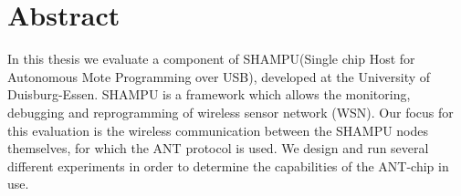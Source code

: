 
\cleardoublepage
\section*{Abstract}
In this thesis we evaluate a component of SHAMPU(Single chip Host for Autonomous Mote Programming over USB), developed at the University of Duisburg-Essen. 
SHAMPU is a framework which allows the monitoring, debugging and reprogramming of wireless sensor network (WSN). 
Our focus for this evaluation is the wireless communication between the SHAMPU nodes themselves, for which the ANT protocol is used. 
We design and run several different experiments in order to determine the capabilities of the ANT-chip in use.
\cleardoublepage
